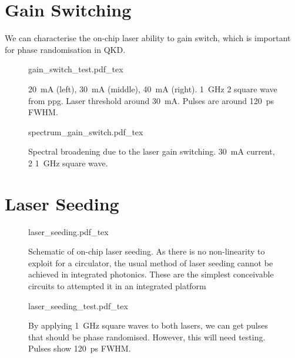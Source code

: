 \section{Gain Switching}

We can characterise the on-chip laser ability to gain switch, which is important for phase randomisation in \ac{QKD}. 

\begin{figure}[tp]
	\centering
	\small	
	\def\svgwidth{\textwidth} 
	{gain_switch_test.pdf_tex}
	\caption[Gain switching test of the HHI on-chip lasers]{\SI{20}{mA} (left), \SI{30}{\mA} (middle), \SI{40}{\mA} (right). \SI{1}{GHz} \SI{2}{\Vpp} square wave from \ac{ppg}. Laser threshold around \SI{30}{mA}. Pulses are around \SI{120}{ps} \ac{FWHM}.}
	\label{fig:gain_switch_test}
\end{figure}

\begin{figure}[tp]
	\centering
	\small	
	\def\svgwidth{0.9\textwidth} 
	{spectrum_gain_switch.pdf_tex}
	\caption[Spectrum of the gain switched laser]{Spectral broadening due to the laser gain switching. \SI{30}{mA} current, \SI{2}{\Vpp} \SI{1}{\GHz} square wave.}
	\label{fig:gain_switch_spectrum}
\end{figure}

\section{Laser Seeding}


\begin{figure}[tp]
	\centering	
	\def\svgwidth{0.9\textwidth} 
	{laser_seeding.pdf_tex}
	\caption[Schematic of on-chip laser seeding]{Schematic of on-chip laser seeding. As there is no non-linearity to exploit for a circulator, the usual method of laser seeding cannot be achieved in integrated photonics. These are the simplest conceivable circuits to attempted it in an integrated platform}
	\label{fig:las_seed_schem}
\end{figure}


\begin{figure}[tp]
	\centering	
	\def\svgwidth{0.8\textwidth} 
	{laser_seeding_test.pdf_tex}
	\caption[Integrated laser seeding test]{By applying \SI{1}{GHz} square waves to both lasers, we can get pulses that should be phase randomised. However,  this will need testing. Pulses show \SI{120}{ps} \ac{FWHM}.}
	\label{fig:las_seed_test}
\end{figure}

